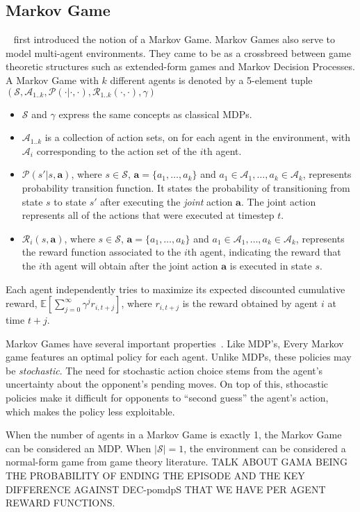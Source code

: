 \documentclass{../main.tex}{subfile}
\begin{document}
\subsection{Markov Game}

~\cite{Owen1982} first introduced the notion of a Markov Game. Markov Games also serve to model multi-agent environments. They came to be as a crossbreed between game theoretic structures such as extended-form games and Markov Decision Processes. 
A Markov Game with $k$ different agents is denoted by a 5-element tuple $(\mathcal{S}, {\mathcal{A}_{1..k}}, \mathcal{P}(\cdot | \cdot, \cdot), {\mathcal{R}_{1..k}(\cdot, \cdot)}, \gamma)$
\begin{itemize}
    \item $\mathcal{S}$ and $\gamma$ express the same concepts as classical MDPs.
    \item $\mathcal{A}_{1..k}$ is a collection of action sets, on for each agent in the environment, with $\mathcal{A}_i$ corresponding to the action set of the $i$th agent.
    \item $\mathcal{P}(s' | s, \mathbf{a})$, where $s \in \mathcal{S}$, $\mathbf{a} = \{a_1,\ldots,a_k\}$ and $a_1 \in \mathcal{A}_1, \ldots, a_k \in \mathcal{A}_k$, represents probability transition function. It states the probability of transitioning from state $s$ to state $s'$ after executing the \textit{joint} action $\mathbf{a}$. The joint action represents all of the actions that were executed at timestep $t$.
    \item $\mathcal{R}_i(s, \mathbf{a})$, where $s \in \mathcal{S}$, $\mathbf{a} = \{a_1,\ldots,a_k\}$ and $a_1 \in \mathcal{A}_1, \ldots, a_k \in \mathcal{A}_k$, represents the reward function associated to the $i$th agent, indicating the reward that the $i$th agent will obtain after the joint action $\mathbf{a}$ is executed in state $s$.
\end{itemize}

Each agent independently tries to maximize its expected discounted cumulative reward, $\mathbb{E}[\sum_{j=0}^{\infty} \gamma^{j} r_{i,t+j}]$, where $r_{i, t+j}$ is the reward obtained by agent $i$ at time $t+j$.

Markov Games have several important properties~\cite{Owen1982, Littman1994}. Like MDP's, Every Markov game features an optimal policy for each agent. Unlike MDPs, these policies may be \textit{stochastic}. The need for stochastic action choice stems from the agent's uncertainty about the opponent's pending moves. On top of this, sthocastic policies make it difficult for opponents to ``second guess'' the agent's action, which makes the policy less exploitable. 

When the number of agents in a Markov Game is exactly 1, the Markov Game can be considered an MDP\@. When $|\mathcal{S}| = 1$, the environment can be considered a normal-form game from game theory literature. TALK ABOUT GAMA BEING THE PROBABILITY OF ENDING THE EPISODE AND THE KEY DIFFERENCE AGAINST DEC-pomdpS THAT WE HAVE PER AGENT REWARD FUNCTIONS.
\end{document}
